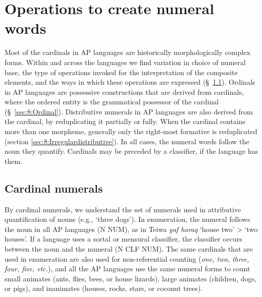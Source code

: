 \section{Operations to create numeral words} 
\label{sec:8:Operations}

Most of the cardinals in AP languages are historically morphologically complex forms. Within and across the languages we find variation in choice of numeral base, the type of operations invoked for the interpretation of the composite elements, and the ways in which these operations are expressed ({\S}~\ref{sec:8:Cardinal}). Ordinals in AP languages are possessive constructions that are derived from cardinals, where the ordered entity is the grammatical possessor of the cardinal ({\S}~\ref{sec:8:Ordinal}). Distributive numerals in AP languages are also derived from the cardinal, by reduplicating it partially or fully. When the cardinal contains more than one morpheme, generally only the right-most formative is reduplicated (section \ref{sec:8:Irregulardistributive}).  In all cases, the numeral words follow the noun they quantify. Cardinals may be preceded by a classifier, if the language has them. 

\subsection{Cardinal numerals}
\label{sec:8:Cardinal}
By cardinal numerals, we understand the set of numerals used in attributive quantification of nouns (e.g., `three dogs'). In enumeration, the numeral follows the noun in all AP languages (N NUM), as in Teiwa \textit{yaf haraq} `house two' {\textgreater} `two houses'. If a language uses a sortal or mensural classifier, the classifier occurs between the noun and the numeral (N CLF NUM). The same cardinals that are used in enumeration are also used for non-referential counting (\textit{one, two, three, four, five, etc.}), and all the AP languages use the same numeral forms to count small animates (ants, flies, bees, or house lizards), large animates (children, dogs, or pigs), and inanimates (houses, rocks, stars, or coconut trees).

